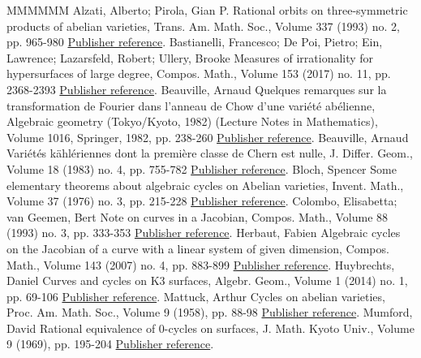 \documentclass[11pt]{article}
\theoremstyle{definition}
\numberwithin{equation}{section}
\numberwithin{figure}{section}
\numberwithin{table}{section}
\begin{document}
\begin{thebibliography}{MMMMMM}
 Alzati, Alberto; Pirola, Gian P. Rational orbits on three-symmetric products of abelian varieties, Trans. Am. Math. Soc., Volume 337 (1993) no. 2, pp. 965-980 \href{https://ahl.centre-mersenne.org/item/AHL_2018__1__313_0/#alzatipirola}{Publisher reference}.
 Bastianelli, Francesco; De Poi, Pietro; Ein, Lawrence; Lazarsfeld, Robert; Ullery, Brooke Measures of irrationality for hypersurfaces of large degree, Compos. Math., Volume 153 (2017) no. 11, pp. 2368-2393 \href{https://ahl.centre-mersenne.org/item/AHL_2018__1__313_0/#lazarsfeld}{Publisher reference}.
 Beauville, Arnaud Quelques remarques sur la transformation de Fourier dans l’anneau de Chow d’une variété abélienne, Algebraic geometry (Tokyo/Kyoto, 1982) (Lecture Notes in Mathematics), Volume 1016, Springer, 1982, pp. 238-260 \href{https://ahl.centre-mersenne.org/item/AHL_2018__1__313_0/#beauvillefourier}{Publisher reference}.
 Beauville, Arnaud Variétés kählériennes dont la première classe de Chern est nulle, J. Differ. Geom., Volume 18 (1983) no. 4, pp. 755-782 \href{https://ahl.centre-mersenne.org/item/AHL_2018__1__313_0/#Beau}{Publisher reference}.
 Bloch, Spencer Some elementary theorems about algebraic cycles on Abelian varieties, Invent. Math., Volume 37 (1976) no. 3, pp. 215-228 \href{https://ahl.centre-mersenne.org/item/AHL_2018__1__313_0/#bloch}{Publisher reference}.
 Colombo, Elisabetta; van Geemen, Bert Note on curves in a Jacobian, Compos. Math., Volume 88 (1993) no. 3, pp. 333-353 \href{https://ahl.centre-mersenne.org/item/AHL_2018__1__313_0/#colombo}{Publisher reference}.
 Herbaut, Fabien Algebraic cycles on the Jacobian of a curve with a linear system of given dimension, Compos. Math., Volume 143 (2007) no. 4, pp. 883-899 \href{https://ahl.centre-mersenne.org/item/AHL_2018__1__313_0/#herbaut}{Publisher reference}.
 Huybrechts, Daniel Curves and cycles on K3 surfaces, Algebr. Geom., Volume 1 (2014) no. 1, pp. 69-106 \href{https://ahl.centre-mersenne.org/item/AHL_2018__1__313_0/#huy}{Publisher reference}.
 Mattuck, Arthur Cycles on abelian varieties, Proc. Am. Math. Soc., Volume 9 (1958), pp. 88-98 \href{https://ahl.centre-mersenne.org/item/AHL_2018__1__313_0/#mattuck}{Publisher reference}.
 Mumford, David Rational equivalence of 0-cycles on surfaces, J. Math. Kyoto Univ., Volume 9 (1969), pp. 195-204 \href{https://ahl.centre-mersenne.org/item/AHL_2018__1__313_0/#mumford}{Publisher reference}.

\end{thebibliography}
\end{document}
